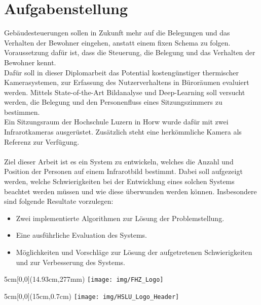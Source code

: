 \documentclass[
	a4paper
]{scrartcl}
\begin{document}
\section{Aufgabenstellung}
Gebäudesteuerungen sollen in Zukunft mehr auf die Belegungen und das Verhalten der Bewohner eingehen, anstatt einem fixen Schema zu folgen. Voraussetzung dafür ist, dass die Steuerung, die Belegung und das Verhalten der Bewohner kennt.\\
Dafür soll in dieser Diplomarbeit das Potential kostengünstiger thermischer Kamerasystemen, zur Erfassung des Nutzerverhaltens in Büroräumen evaluiert werden. Mittels State-of-the-Art Bildanalyse und Deep-Learning soll versucht werden, die Belegung und den Personenfluss eines Sitzungszimmers zu bestimmen.\\
Ein Sitzungsraum der Hochschule Luzern in Horw wurde dafür mit zwei Infrarotkameras ausgerüstet. Zusätzlich steht eine herkömmliche Kamera als Referenz zur Verfügung.\\
\\
Ziel dieser Arbeit ist es ein System zu entwickeln, welches die Anzahl und Position der Personen auf einem Infrarotbild bestimmt. Dabei soll aufgezeigt werden, welche Schwierigkeiten bei der Entwicklung eines solchen Systems beachtet werden müssen und wie diese überwunden werden können.
Insbesondere sind folgende Resultate vorzulegen:
\begin{itemize}[noitemsep]
	\item Zwei implementierte Algorithmen zur Lösung der Problemstellung.
	\item Eine ausführliche Evaluation des Systems.
	\item Möglichkeiten und Vorschläge zur Lösung der aufgetretenen Schwierigkeiten und zur Verbesserung des Systems.
\end{itemize}

\vspace{0.5em}
\noindent
\begin{textblock*}{5cm}[0,0](14.93cm,277mm)
	\texttt{[image: img/FHZ\_Logo]}
\end{textblock*}

\newpage

\begin{textblock*}{5cm}[0,0](15cm,0.7cm)
	\texttt{[image: img/HSLU\_Logo\_Header]}
\end{textblock*}
\end{document}
